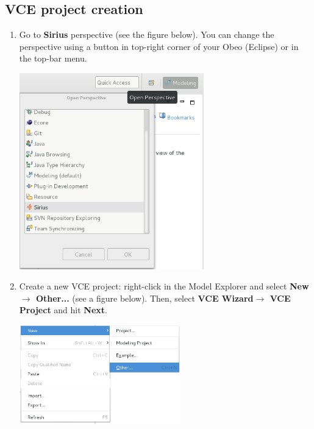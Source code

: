\documentclass[12pt]{article}
\begin{document}
\subsection{VCE project creation}
\begin{enumerate}
\item
Go to \textbf{Sirius} perspective (see the figure below). You can change the perspective using a button in top-right corner of your Obeo (Eclipse) or in the top-bar menu.
     \centerline{
     \includegraphics[width=8cm]{draws/sirius-persp.png}
     \label{fig:sirius-persp}
     }
\item
Create a new VCE project: right-click in the Model Explorer and select \textbf{New$\rightarrow$ Other...} (see a figure below). Then, select \textbf{VCE Wizard$\rightarrow$ VCE Project} and hit \textbf{Next}.

    \centerline{
     \includegraphics[width=7cm]{draws/new-other.png}
     \label{fig:new-other}
     }
 

\end{enumerate}
\end{document}
